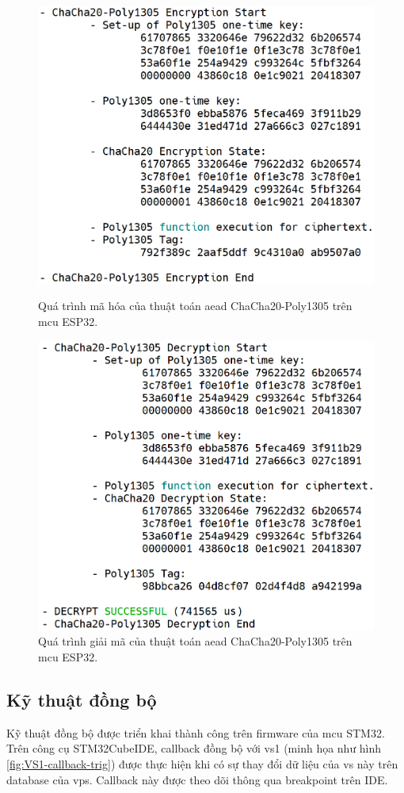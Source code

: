 \begin{figure}[htp]
\centering
\captionsetup{justification=centering,margin=2cm}
\includegraphics[width=0.7\linewidth, frame]{images/fig-CC20-P1305-En-Process.png}
\caption{Quá trình mã hóa của thuật toán \acrshort{aead} ChaCha20-Poly1305 trên \acrshort{mcu} ESP32.}
\label{fig:CC20-P1305-En-Process}
\includegraphics[width=0.7\linewidth, frame]{images/fig-CC20-P1305-De-Process.png}
\caption{Quá trình giải mã của thuật toán \acrshort{aead} ChaCha20-Poly1305 trên \acrshort{mcu} ESP32.}
\label{fig:CC20-P1305-De-Process}
\end{figure}

\subsection{Kỹ thuật đồng bộ}

Kỹ thuật đồng bộ được triển khai thành công trên firmware của \acrshort{mcu} STM32. Trên công cụ STM32CubeIDE, callback đồng bộ với \acrshort{vs}1 (minh họa như hình \ref{fig:VS1-callback-trig}) được thực hiện khi có sự thay đổi dữ liệu của \acrshort{vs} này trên database của \acrshort{vps}. Callback này được theo dõi thông qua breakpoint trên IDE.

